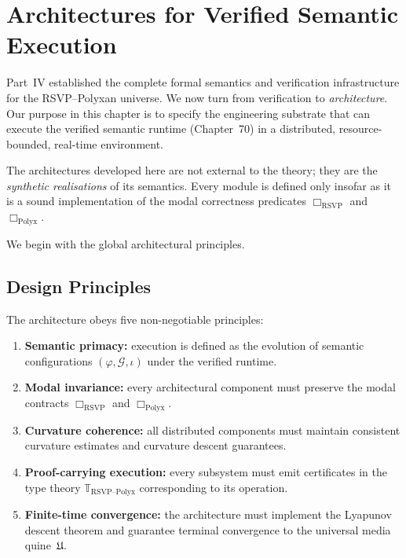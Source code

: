 \chapter{Architectures for Verified Semantic Execution}
\label{ch:71}

Part~IV established the complete formal semantics and verification infrastructure 
for the RSVP--Polyxan universe.  
We now turn from verification to \emph{architecture}.  
Our purpose in this chapter is to specify the engineering substrate that can 
execute the verified semantic runtime (Chapter~70) in a distributed, 
resource-bounded, real-time environment.

The architectures developed here are not external to the theory;  
they are the \emph{synthetic realisations} of its semantics.  
Every module is defined only insofar as it is a sound implementation of the 
modal correctness predicates $\Box_{\mathrm{RSVP}}$ and $\Box_{\mathrm{Polyx}}$.

We begin with the global architectural principles.

\section{Design Principles}

The architecture obeys five non-negotiable principles:

\begin{enumerate}
\item \textbf{Semantic primacy:}  
      execution is defined as the evolution of semantic configurations 
      $(\varphi,\mathcal{G},\iota)$ under the verified runtime.

\item \textbf{Modal invariance:}  
      every architectural component must preserve the modal contracts  
      $\Box_{\mathrm{RSVP}}$ and $\Box_{\mathrm{Polyx}}$.

\item \textbf{Curvature coherence:}  
      all distributed components must maintain consistent curvature estimates  
      and curvature descent guarantees.

\item \textbf{Proof-carrying execution:}  
      every subsystem must emit certificates in the type theory 
      $\mathbb{T}_{\mathrm{RSVP\text{--}Polyx}}$ corresponding to its operation.

\item \textbf{Finite-time convergence:}  
      the architecture must implement the Lyapunov descent theorem and guarantee 
      terminal convergence to the universal media quine~$\mathfrak{U}$.
\end{enumerate}

